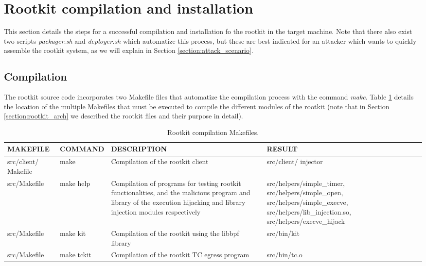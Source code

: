 \section{Rootkit compilation and installation} \label{section:compile_install}
This section details the steps for a successful compilation and installation fo the rootkit in the target machine. Note that there also exist two scripts \textit{packager.sh} and \textit{deployer.sh} which automatize this process, but these are best indicated for an attacker which wants to quickly assemble the rootkit system, as we will explain in Section \ref{section:attack_scenario}.

\subsection{Compilation}
The rootkit source code incorporates two Makefile files that automatize the compilation process with the command \textit{make}. Table \ref{table:makefiles} details the location of the multiple Makefiles that must be executed to compile the different modules of the rootkit (note that in Section \ref{section:rootkit_arch} we described the rootkit files and their purpose in detail).

\begin{table}[htbp]
\begin{tabular}{|>{\centering\arraybackslash}p{2.2cm}|>{\centering\arraybackslash}p{2.2cm}|>{\centering\arraybackslash}p{4cm}|>{\centering\arraybackslash}p{4.5cm}|}
\hline
\textbf{MAKEFILE} & \textbf{COMMAND} &\textbf{DESCRIPTION}&\textbf{RESULT}\\
\hline
\hline
src/client/ Makefile & make & Compilation of the rootkit client & src/client/ injector\\
\hline
src/Makefile & make help & Compilation of programs for testing rootkit functionalities, and the malicious program and library of the execution hijacking and library injection modules respectively & src/helpers/simple\_timer, src/helpers/simple\_open, src/helpers/simple\_execve, src/helpers/lib\_injection.so, src/helpers/execve\_hijack\\
\hline
src/Makefile & make kit & Compilation of the rootkit using the libbpf library & src/bin/kit\\
\hline
src/Makefile & make tckit & Compilation of the rootkit TC egress program & src/bin/tc.o\\
\hline
\end{tabular}
\caption{Rootkit compilation Makefiles.}
\label{table:makefiles}
\end{table}

